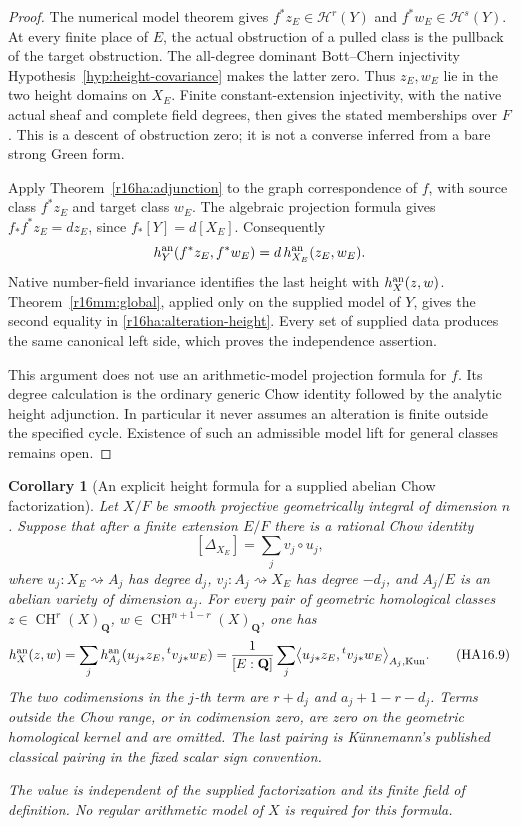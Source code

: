 \documentclass[11pt,a4paper]{article}
\newtheorem{corollary}[theorem]{Corollary}
\theoremstyle{definition}
\theoremstyle{remark}
\numberwithin{equation}{section}
\begin{document}
\begin{proof}
The numerical model theorem gives
$f^*z_E\in\mathcal H^r(Y)$ and
$f^*w_E\in\mathcal H^s(Y)$. At every finite place of $E$,
the actual obstruction of a pulled class is the pullback of the
target obstruction. The all-degree dominant Bott--Chern
injectivity Hypothesis~\ref{hyp:height-covariance} makes the latter zero.
Thus $z_E,w_E$ lie in the two height domains on $X_E$.
Finite constant-extension injectivity, with the native actual
sheaf and complete field degrees, then gives the stated
memberships over $F$. This is a descent of obstruction zero;
it is not a converse inferred from a bare strong Green form.

Apply Theorem~\ref{r16ha:adjunction} to the graph correspondence
of $f$, with source class $f^*z_E$ and target class $w_E$.
The algebraic projection formula gives
$f_*f^*z_E=d z_E$, since $f_*[Y]=d[X_E]$.
Consequently
\[
                 h_Y^{\rm an}(f^*z_E,f^*w_E)
                         =d\,h_{X_E}^{\rm an}(z_E,w_E).
\]
Native number-field invariance identifies the last height with
$h_X^{\rm an}(z,w)$. Theorem~\ref{r16mm:global}, applied only
on the supplied model of $Y$, gives the second equality in
\eqref{r16ha:alteration-height}. Every set of supplied data
produces the same canonical left side, which proves the
independence assertion.

This argument does not use an arithmetic-model projection
formula for $f$. Its degree calculation is the ordinary generic
Chow identity followed by the analytic height
adjunction. In particular it never assumes an alteration is
finite outside the specified cycle. Existence of such an
admissible model lift for general classes remains open.
\end{proof}

\begin{corollary}[An explicit height formula for a supplied abelian Chow factorization]
\label{r16ha:motivic-formula}
Let $X/F$ be smooth projective geometrically integral of
dimension $n$. Suppose that after a finite extension $E/F$
there is a rational Chow identity
\[
                 [\Delta_{X_E}]=\sum_j v_j\circ u_j,
 \tag{HA16.8}\label{r16ha:factorization}
\]
where $u_j:X_E\rightsquigarrow A_j$ has degree $d_j$,
$v_j:A_j\rightsquigarrow X_E$ has degree $-d_j$, and
$A_j/E$ is an abelian variety of dimension $a_j$.
For every pair of geometric homological classes
$z\in\operatorname{CH}^r(X)_{\mathbf Q}$,
$w\in\operatorname{CH}^{n+1-r}(X)_{\mathbf Q}$, one has
\[
 h_X^{\rm an}(z,w)
   =\sum_j h_{A_j}^{\rm an}
                   (u_{j*}z_E,{}^tv_{j*}w_E)
   =\frac1{[E:\mathbf Q]}\sum_j
        \bigl\langle u_{j*}z_E,{}^tv_{j*}w_E\bigr\rangle_{A_j,\mathrm{Kun}}.
 \tag{HA16.9}\label{r16ha:motivic-height}
\]
The two codimensions in the $j$-th term are
$r+d_j$ and $a_j+1-r-d_j$. Terms outside the Chow range, or
in codimension zero, are zero on the geometric homological
kernel and are omitted. The last pairing is K\"unnemann's
published classical pairing in the fixed scalar sign convention.

The value is independent of the supplied factorization and its
finite field of definition. No regular arithmetic model of
$X$ is required for this formula.
\end{corollary}
\end{document}
